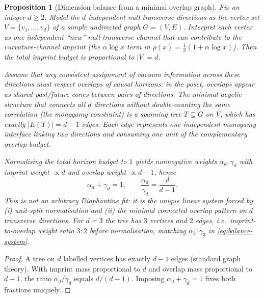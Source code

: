 \documentclass[11pt]{amsart}
\newtheorem{proposition}[theorem]{Proposition}
\begin{document}
\begin{proposition}[Dimension balance from a minimal overlap graph]
\label{prop:balance-spanning-tree}
Fix an integer \(d\ge 2\). Model the \(d\) independent null-transverse directions as the vertex set \(V=\{v_1,\dots,v_d\}\) of a simple undirected graph \(G=(V,E)\). Interpret each vertex as one independent ``new'' null-transverse channel that can contribute to the curvature-channel imprint (the \(\alpha\log x\) term in \(\rho(x)=\frac1x(1+\alpha\log x)\)). Then the total imprint budget is proportional to \(|V|=d\).

Assume that any consistent assignment of vacuum information across these directions must respect overlaps of causal horizons: in the poset, overlaps appear as shared past/future cones between pairs of directions. The minimal acyclic structure that connects all \(d\) directions without double-counting the same correlation (the monogamy constraint) is a spanning tree \(T\subseteq G\) on \(V\), which has exactly \(|E(T)|=d-1\) edges. Each edge represents one independent monogamy interface linking two directions and consuming one unit of the complementary overlap budget.

Normalising the total horizon budget to \(1\) yields nonnegative weights \(\alpha_d,\gamma_d\) with imprint weight \(\propto d\) and overlap weight \(\propto d-1\), hence
\begin{equation}
\label{eq:balance-system}
\alpha_d+\gamma_d=1,\qquad \frac{\alpha_d}{\gamma_d}=\frac{d}{d-1}.
\end{equation}
This is not an arbitrary Diophantine fit: it is the unique linear system forced by \emph{(i)} unit-split normalisation and \emph{(ii)} the minimal connected overlap pattern on \(d\) transverse directions. For \(d=3\) the tree has \(3\) vertices and \(2\) edges, i.e.\ imprint-to-overlap weight ratio \(3:2\) before normalisation, matching \(\alpha_3:\gamma_3\) in \eqref{eq:balance-system}.
\end{proposition}

\begin{proof}
A tree on \(d\) labelled vertices has exactly \(d-1\) edges (standard graph theory). With imprint mass proportional to \(d\) and overlap mass proportional to \(d-1\), the ratio \(\alpha_d/\gamma_d\) equals \(d/(d-1)\). Imposing \(\alpha_d+\gamma_d=1\) fixes both fractions uniquely.
\end{proof}
\end{document}
